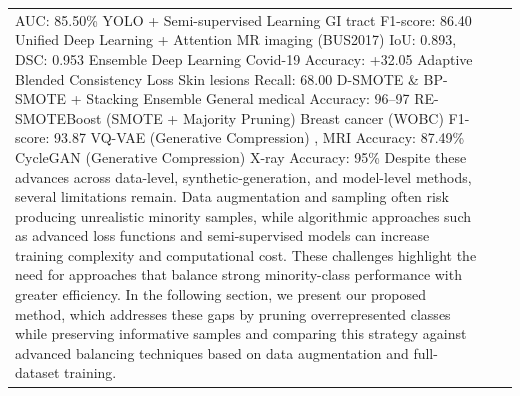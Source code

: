 \documentclass[twocolumn]{svjour3}
\begin{document}
\begin{table}[htbp]
\begin{tabular}{lll}
AUC: 85.50\%
YOLO + Semi-supervised Learning \cite{ref37}
GI tract
F1-score: 86.40
Unified Deep Learning + Attention \cite{ref35}
MR imaging (BUS2017)
IoU: 0.893, DSC: 0.953
Ensemble Deep Learning \cite{ref34}
Covid-19
Accuracy: +32.05
Adaptive Blended Consistency Loss \cite{ref31}
Skin lesions
Recall: 68.00
D-SMOTE \& BP-SMOTE + Stacking Ensemble \cite{ref18}
General medical
Accuracy: 96--97
RE-SMOTEBoost (SMOTE + Majority Pruning) \cite{ref17}
Breast cancer (WOBC)
F1-score: 93.87
VQ-VAE (Generative Compression) \cite{ref38},
MRI
Accuracy: 87.49\%
CycleGAN (Generative Compression) \cite{ref39}
X-ray
Accuracy: 95\%
Despite these advances across data-level, synthetic-generation, and model-level methods, several limitations remain. Data augmentation and sampling often risk producing unrealistic minority samples, while algorithmic approaches such as advanced loss functions and semi-supervised models can increase training complexity and computational cost. These challenges highlight the need for approaches that balance strong minority-class performance with greater efficiency. In the following section, we present our proposed method, which addresses these gaps by pruning overrepresented classes while preserving informative samples and comparing this strategy against advanced balancing techniques based on data augmentation and full-dataset training.

\end{tabular}
\end{table}
\end{document}
